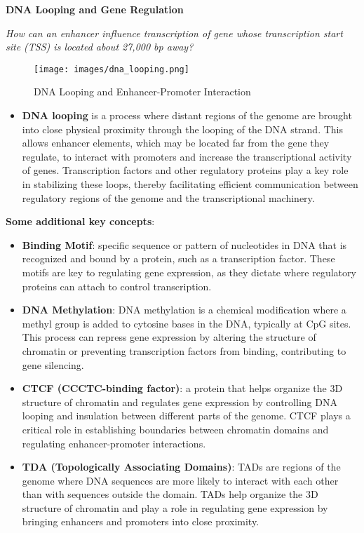 \documentclass[a4paper]{article}
\begin{document}
\textbf{DNA Looping and Gene Regulation}

\textit{How can an enhancer influence transcription of gene whose transcription 
start site (TSS) is located about 27,000 bp away?}

\begin{figure}[H]
  \centering
  \texttt{[image: images/dna\_looping.png]}
  \caption{DNA Looping and Enhancer-Promoter Interaction}
\end{figure}

\begin{itemize}
  \item \textbf{DNA looping} is a process where distant regions of the genome 
  are brought into close physical proximity through the looping of the DNA 
  strand. This allows enhancer elements, which may be located far from the 
  gene they regulate, to interact with promoters and increase the transcriptional 
  activity of genes. Transcription factors and other regulatory proteins play 
  a key role in stabilizing these loops, thereby facilitating efficient 
  communication between regulatory regions of the genome and the transcriptional 
  machinery.
\end{itemize}

\textbf{Some additional key concepts}: 

\begin{itemize}

  \item \textbf{Binding Motif}: specific sequence or pattern of 
  nucleotides in DNA that is recognized and bound by a protein, such as a 
  transcription factor. These motifs are key to regulating gene expression, 
  as they dictate where regulatory proteins can attach to control transcription.

  \item \textbf{DNA Methylation}: DNA methylation is a chemical modification 
  where a methyl group is added to cytosine bases in the DNA, typically at 
  CpG sites. This process can repress gene expression by altering the structure 
  of chromatin or preventing transcription factors from binding, contributing 
  to gene silencing.

  \item \textbf{CTCF (CCCTC-binding factor)}: a protein that helps organize the
  3D structure of chromatin and regulates gene expression by controlling DNA
  looping and insulation between different parts of the genome. CTCF plays a
  critical role in establishing boundaries between chromatin domains and
  regulating enhancer-promoter interactions.

  \item \textbf{TDA (Topologically Associating Domains)}: TADs are regions of
  the genome where DNA sequences are more likely to interact with each other
  than with sequences outside the domain. TADs help organize the 3D structure
  of chromatin and play a role in regulating gene expression by bringing
  enhancers and promoters into close proximity.
\end{itemize}
\end{document}
